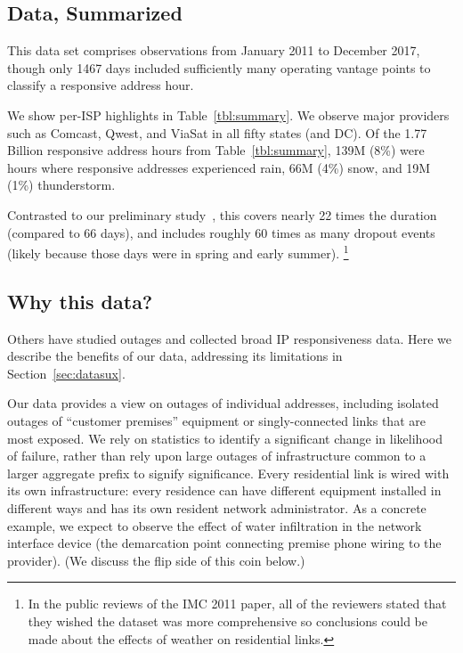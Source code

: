 \subsection{Data, Summarized} %


This data set comprises observations from January 2011 to December 2017,
though only 1467 days included sufficiently many operating vantage points to
classify a responsive address hour.

We show per-ISP highlights in Table~\ref{tbl:summary}.  We
observe major providers such as Comcast, Qwest, and ViaSat
in all fifty states (and DC).  Of the 1.77 Billion
responsive address hours from Table~\ref{tbl:summary}, 139M
(8\%) were hours where responsive addresses experienced
rain, 66M (4\%) snow, and 19M (1\%) thunderstorm.

Contrasted to our preliminary study~\cite{pingin}, this
covers nearly 22 times the duration (compared to 66 days),
and includes roughly 60 times as many dropout events (likely
because those days were in spring and early summer).%
%
\footnote{In the public reviews of the IMC 2011 paper, all of the reviewers stated that
they wished the dataset was more comprehensive so conclusions could be made
about the effects of weather on residential links.}
%
%
%
%


\subsection{Why this data?} %

Others have studied outages and collected broad IP
responsiveness data.  Here we describe the benefits
of our data, addressing its limitations in Section~\ref{sec:datasux}.

Our data provides a view on outages of individual addresses,
including isolated outages of ``customer premises''
equipment or singly-connected links that are most exposed.
We rely on statistics to identify a significant change in likelihood of
failure, rather than rely upon large outages of infrastructure
common to a larger aggregate prefix to signify significance.
Every residential link is wired with its
own infrastructure: every residence can have different equipment installed
in different ways and has its own resident network administrator.
As a concrete example, we expect to observe
the effect of water infiltration in the network interface
device (the demarcation point connecting premise phone
wiring to the provider).  (We discuss the flip side of this
coin below.)

